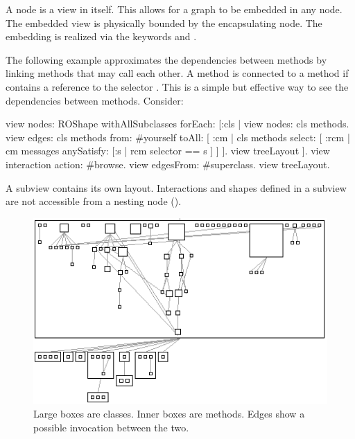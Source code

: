 \documentclass[a4paper,10pt,twoside]{book}
\begin{document}
A node is a view in itself. This allows for a graph to be embedded in any node. The embedded view is physically bounded by the encapsulating node. The embedding is realized via the keywords  and . 

The following example approximates the dependencies between methods by linking methods that may call each other. A method  is connected to a method  if  contains a reference to the selector . This is a simple but effective way to see the dependencies between methods. Consider:

\begin{code}{}
view nodes: ROShape withAllSubclasses forEach: [:cls |
	view nodes: cls methods.
	view edges: cls methods from: #yourself toAll: [ :cm | cls methods select: [ :rcm |  cm messages anySatisfy: [:s | rcm selector == s ] ] ].
	view treeLayout
].
view interaction action: #browse.
view edgesFrom: #superclass.
view treeLayout.
\end{code}

A subview contains its own layout. Interactions and shapes defined in a subview are not accessible from a nesting node (). 



\begin{figure}[htbp]
\centerline{\includegraphics[width=0.6\linewidth]{methodDependencies.png}}
\caption{Large boxes are classes. Inner boxes are methods. Edges show a possible invocation between the two.}
\label{fig:abstractClasses3}
\end{figure}
\end{document}
